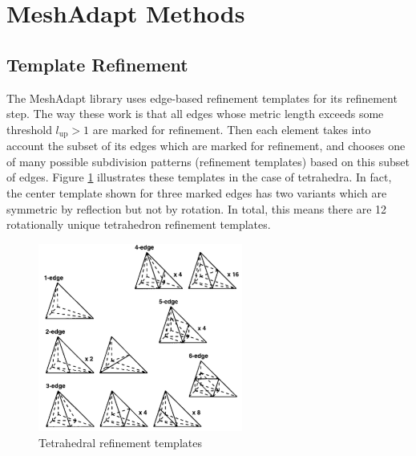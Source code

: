 \section{MeshAdapt Methods}
\label{sec:ma_methods}

\subsection{Template Refinement}

The MeshAdapt library uses edge-based refinement templates for its refinement step.
The way these work is that all edges whose metric length exceeds some threshold
$l_{\text{up}} > 1$ are marked for refinement.
Then each element takes into account the subset of its edges which are marked
for refinement, and chooses one of many possible subdivision patterns
(refinement templates) based on this subset of edges.
Figure \ref{fig:tet_templates} illustrates these templates in the case of tetrahedra.
In fact, the center template shown for three marked edges has two variants which
are symmetric by reflection but not by rotation.
In total, this means there are 12 rotationally unique tetrahedron refinement templates.

\begin{figure}
\begin{center}
\includegraphics[width=0.6\textwidth]{tet_templates.png}
\caption{Tetrahedral refinement templates}
\label{fig:tet_templates}
\end{center}
\end{figure}

